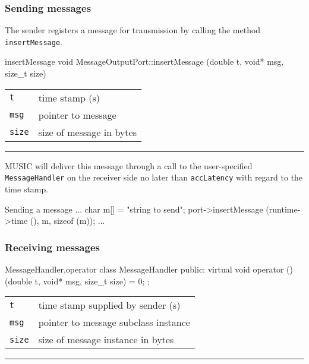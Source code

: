 \documentclass[a4paper,twoside]{report}
\makeatletter
\newenvironment{parameters}%
{\begin{tabular}{@{\hspace{2em}}lp{0.6\textwidth}}}%
{\end{tabular}\par\vspace{1mm}\par\hrule\par\vspace{5mm}}
\makeatother
\begin{document}
\subsubsection{Sending messages}

The sender registers a message for transmission by calling the method\\
\lstinline|insertMessage|.

\begin{head}{insertMessage}
  void MessageOutputPort::insertMessage (double t,
                                         void* msg,
                                         size_t size)
\end{head}
\begin{parameters}
  \lstinline|t| & time stamp (s) \\
  \lstinline|msg| & pointer to message \\
  \lstinline|size| & size of message in bytes \\
\end{parameters}

MUSIC will deliver this message through a call to the user-specified \\
\lstinline|MessageHandler| on the receiver side no later than
\lstinline|accLatency| with regard to the time stamp.

\begin{code}{Sending a message}
{
  ...
  char m[] = "string to send";
  port->insertMessage (runtime->time (), m, sizeof (m));
  ...
}
\end{code}


\subsubsection{Receiving messages}

\begin{head}{MessageHandler,operator}
  class MessageHandler {
  public:
    virtual void operator () (double t,
                              void* msg,
                              size_t size) = 0;
  };
\end{head}
\begin{parameters}
  \lstinline|t| & time stamp supplied by sender (s) \\
  \lstinline|msg| & pointer to message subclass instance \\
  \lstinline|size| & size of message instance in bytes \\
\end{parameters}
\end{document}
